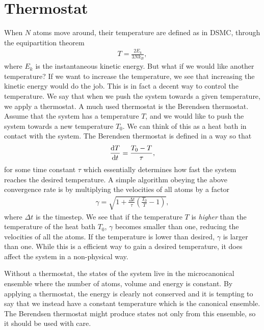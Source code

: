 \section{Thermostat}
When $N$ atoms move around, their temperature are defined as in DSMC, through the equipartition theorem
\begin{align}
	T = \frac{2E_k}{3Nk_B},
\end{align}
where $E_k$ is the instantaneous kinetic energy. But what if we would like another temperature? If we want to increase the temperature, we see that increasing the kinetic energy would do the job. This is in fact a decent way to control the temperature. We say that when we push the system towards a given temperature, we apply a thermostat. A much used thermostat is the Berendsen thermostat. Assume that the system has a temperature $T$, and we would like to push the system towards a new temperature $T_0$. We can think of this as a heat bath in contact with the system. The Berendsen thermostat is defined in a way so that
\begin{align}
	\frac{\mathrm{d}T}{\mathrm{d}t} = \frac{T_0 - T}{\tau},
\end{align}
for some time constant $\tau$ which essentially determines how fast the system reaches the desired temperature. A simple algorithm obeying the above convergence rate is by multiplying the velocities of all atoms by a factor 
\begin{align}
	\gamma = \sqrt{1 + \frac{\Delta t}{\tau}\left(\frac{T_0}{T} - 1\right)},
\end{align}
where $\Delta t$ is the timestep. We see that if the temperature $T$ is \textit{higher} than the temperature of the heat bath $T_0$, $\gamma$ becomes smaller than one, reducing the velocities of all the atoms. If the temperature is lower than desired, $\gamma$ is larger than one. While this is a efficient way to gain a desired temperature, it does affect the system in a non-physical way. 

Without a thermostat, the states of the system live in the microcanonical ensemble where the number of atoms, volume and energy is constant. By applying a thermostat, the energy is clearly not conserved and it is tempting to say that we instead have a constant temperature which is the canonical ensemble. The Berendsen thermostat might produce states not only from this ensemble, so it should be used with care. 

